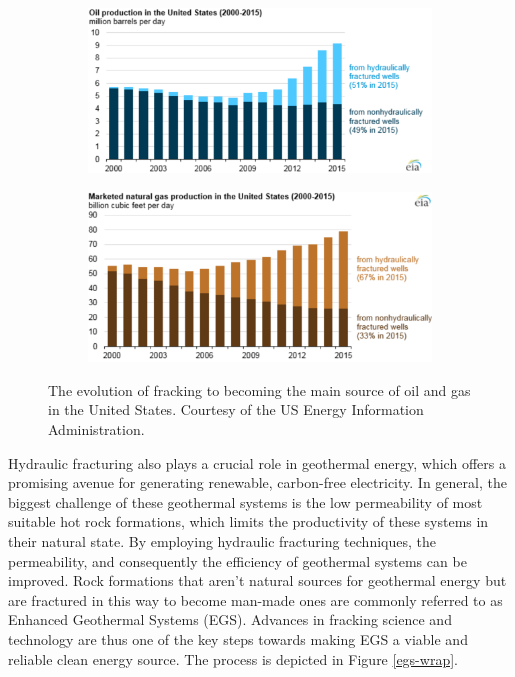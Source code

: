 \begin{figure}[h]
    \begin{subfigure}{.49\textwidth}
      \centering
      \includegraphics[width=\linewidth]{Chapter1/oil_from_fracs.png}
      \label{fig:oil_fracs}
    \end{subfigure}%
    \begin{subfigure}{.49\textwidth}
      \centering
      \includegraphics[width=\linewidth]{Chapter1/gas_from_fracs.png}
      \label{fig:gas_fracs}
    \end{subfigure}%
      \caption{The evolution of fracking to becoming the main source of oil and gas in the United States. Courtesy of the US Energy Information Administration.}
\end{figure}\label{oil_and_gas_production}

Hydraulic fracturing also plays a crucial role in geothermal energy, which offers a promising avenue for generating renewable, carbon-free electricity. In general, the biggest challenge of these geothermal systems is the low permeability of most suitable hot rock formations, which limits the productivity of these systems in their natural state. By employing hydraulic fracturing techniques, the permeability, and consequently the efficiency of geothermal systems can be improved. Rock formations that aren't natural sources for geothermal energy but are fractured in this way to become man-made ones are commonly referred to as Enhanced Geothermal Systems (EGS). Advances in fracking science and technology are thus one of the key steps towards making EGS a viable and reliable clean energy source. The process is depicted in Figure \ref{egs-wrap}.


